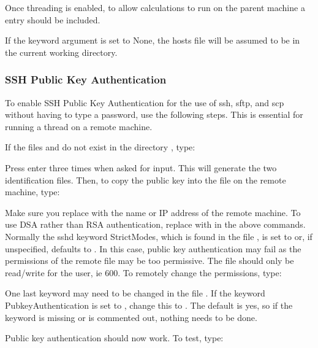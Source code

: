 Once threading is enabled, to allow calculations to run on the parent machine a  entry should be included.


If the keyword argument  is set to None, the hosts file will be assumed to be in the current working directory.



\subsubsection{SSH Public Key Authentication}

To enable SSH Public Key Authentication for the use of ssh, sftp, and scp without having to type a password, use the following steps.  This is essential for running a thread on a remote machine.


If the files  and  do not exist in the directory , type:



Press enter three times when asked for input.  This will generate the two identification files.  Then, to copy the public key into the  file on the remote machine, type:



Make sure you replace  with the name or IP address of the remote machine.  To use DSA rather than RSA authentication, replace  with  in the above commands. Normally the sshd keyword StrictModes, which is found in the file , is set to  or, if unspecified, defaults to .  In this case, public key authentication may fail as the permissions of the remote file  may be too permissive.  The file should only be read/write for the user, ie 600.  To remotely change the permissions, type:



One last keyword may need to be changed in the file .  If the keyword PubkeyAuthentication is set to , change this to .  The default is yes, so if the keyword is missing or is commented out, nothing needs to be done.


Public key authentication should now work.  To test, type:


